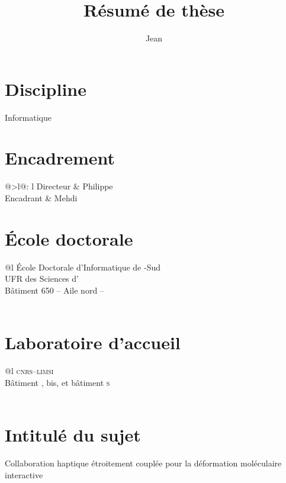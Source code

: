 \documentclass[10pt,myfrancais]{article}
\title{\bfseries\sffamily Résumé de thèse}
\author{Jean \myname{Simard}}
\date{}
\begin{document}
	\maketitle
	\section*{Discipline}
	Informatique
	\section*{Encadrement}
	\begin{mytabular}{@{}>{\bfseries}l@{: }l}
		Directeur & Philippe  \\
		Encadrant & Mehdi  \\
	\end{mytabular}
	\section*{École doctorale}
	\begin{mytabular}{@{}l}
		\myrowstyle{\bfseries}
		École Doctorale d'Informatique de -Sud \\
		UFR des Sciences d' \\
		Bâtiment 650 -- Aile nord --  \\
		  \\
	\end{mytabular}
	\section*{Laboratoire d'accueil}
	\begin{mytabular}{@{}l}
		\myrowstyle{\bfseries}
		\textsc{cnrs--limsi}\\
		Bâtiment , bis,  et bâtiment \textsc{s} \\
		  \\
	\end{mytabular}
	\section*{Intitulé du sujet}
	Collaboration haptique étroitement couplée pour la déformation moléculaire interactive
\end{document}
